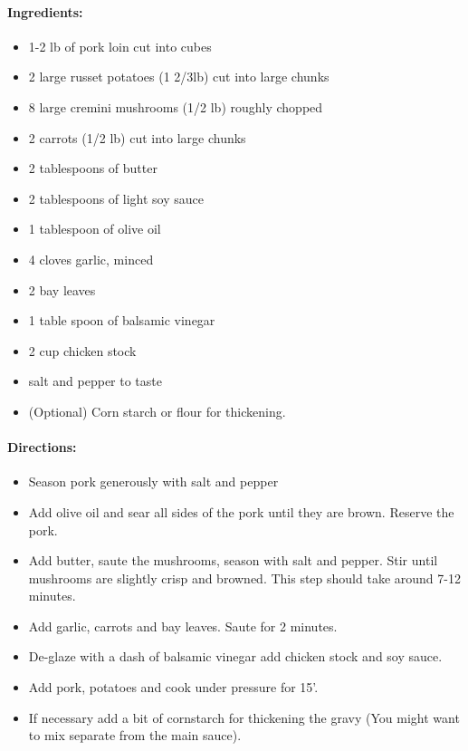 \documentclass{article}
\begin{document}
\paragraph{Ingredients:}
\begin{itemize}
    \item 1-2 lb of pork loin cut into cubes
    \item 2 large russet potatoes (1 2/3lb) cut into large chunks
    \item 8 large cremini mushrooms (1/2 lb) roughly chopped
    \item 2 carrots (1/2 lb) cut into large chunks
    \item 2 tablespoons of butter
    \item 2 tablespoons of light soy sauce
    \item 1 tablespoon of olive oil
    \item 4 cloves garlic, minced
    \item 2 bay leaves
    \item 1 table spoon of balsamic vinegar
    \item 2 cup chicken stock
    \item salt and pepper to taste
    \item (Optional) Corn starch or flour for thickening.
\end{itemize}

\paragraph{Directions:}
\begin{itemize}
    \item Season pork generously with salt and pepper
    \item Add olive oil and sear all sides of the pork until they are brown. Reserve the pork.
    \item Add butter, saute the mushrooms, season with salt and pepper. Stir until mushrooms are slightly crisp and browned. This step should take around 7-12 minutes.
    \item Add garlic, carrots and bay leaves. Saute for 2 minutes.
    \item De-glaze with a dash of balsamic vinegar add chicken stock and soy sauce.
    \item Add pork, potatoes and cook under pressure for 15’.
    \item If necessary add a bit of cornstarch for thickening the gravy (You might want to mix separate from the main sauce).
\end{itemize}
\end{document}
